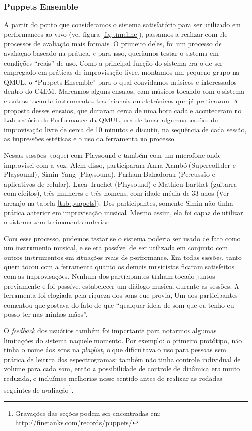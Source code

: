 \subsubsection{Puppets Ensemble}

A partir do ponto que consideramos o sistema satisfatório para ser utilizado em performances ao vivo (ver figura \ref{fig:timeline}), passamos a realizar com ele processos de avaliação mais formais. O primeiro deles, foi um processo de avaliação baseado na prática, e para isso, queríamos testar o sistema em condições ``reais'' de uso. Como a principal função do sistema era o de ser empregado em práticas de improvisação livre, montamos um pequeno grupo na QMUL, o ``Puppets Ensemble'' para o qual convidamos músicos e interessados dentro do C4DM. Marcamos alguns ensaios, com músicos tocando com o sistema e outros tocando instrumentos tradicionais ou eletrônicos que já praticavam. A proposta desses ensaios, que duraram cerca de uma hora cada e aconteceram no Laboratório de Performance da QMUL, era de tocar algumas sessões de improvisação livre de cerca de 10 minutos e discutir, na sequência de cada sessão, as impressões estéticas e o uso da ferramenta no processo.

Nessas sessões, toquei com Playsound e também com um microfone onde improvisei com a voz. Além disso, participaram Anna Xambó (Supercollider e Playsound), Simin Yang (Playsound), Parham Bahadoran (Percussão e aplicativos de celular). Luca Truchet (Playsound) e Mathieu Barthet (guitarra com efeitos), três mulheres e três homens, com idade média de 33 anos (Ver arranjo na tabela \ref{tab:puppets}). Dos participantes, somente Simin não tinha prática anterior em improvisação musical. Mesmo assim, ela foi capaz de utilizar o sistema sem treinamento anterior.

Com esse processo, pudemos testar se o sistema poderia ser usado de fato como um instrumento musical, e se era possível de ser utilizado em conjunto com outros instrumentos em situações reais de performance. Em todas sessões, tanto quem tocou com a ferramenta quanto os demais musicistas ficaram satisfeitos com as improvisações. Nenhum dos participantes tinham tocado juntos previamente e foi possível estabelecer um diálogo musical durante as sessões. A ferramenta foi elogiada pela riqueza dos sons que provia, Um dos participantes comentou que gostava do fato de que ``qualquer ideia de som que eu tenho eu posso ter nas minhas mãos''. 

O \emph{feedback} dos usuários também foi importante para notarmos algumas limitações do sistema naquele momento. Por exemplo: o primeiro protótipo, não tinha o nome dos sons na \emph{playlist}, o que dificultava o uso para pessoas sem prática de leitura dos espectrogramas; também não tinha controle individual de volume para cada som, então a possibilidade de controle de dinâmica era muito reduzida, e incluímos melhorias nesse sentido antes de realizar as rodadas seguintes de avaliação\footnote{Gravações das seções podem ser encontradas em: \url{http://finetanks.com/records/puppets/}}.

